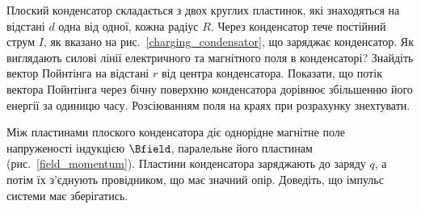 \begin{problem}\label{prb:charging_condensator}
Плоский конденсатор складається з двох круглих пластинок, які знаходяться на відстані $d$  одна від одної, кожна  радіус $R$. Через конденсатор тече постійний струм $I$, як вказано на рис.~\ref{charging_condensator}, що заряджає конденсатор. Як виглядають силові лінії електричного та магнітного поля в конденсаторі? Знайдіть вектор Пойнтінга на відстані $r$ від центра конденсатора. Показати, що потік вектора Пойнтінга через бічну поверхню конденсатора дорівнює збільшенню його енергії за одиницю часу. Розсіюванням поля на краях при розрахунку знехтувати.
\end{problem}

\begin{problem}\label{prb:field_momentum}
    Між пластинами плоского конденсатора діє однорідне магнітне поле напруженості індукцією $\Bfield$, паралельне його пластинам (рис.~\ref{field_momentum}). Пластини конденсатора заряджають до заряду $q$, а потім їх з'єднують провідником, що має значний опір. Доведіть, що імпульс системи має зберігатись. 
\end{problem}

